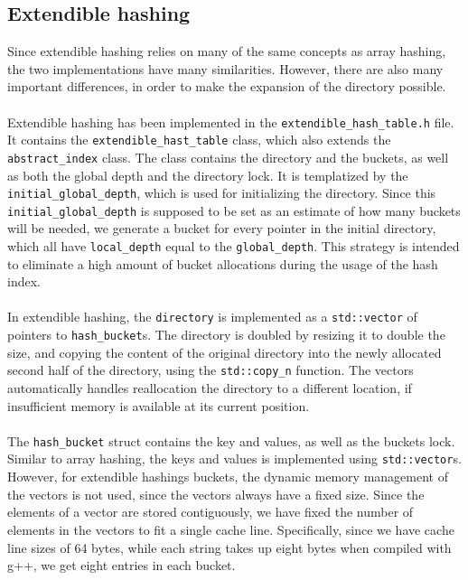 \documentclass[11pt]{report} %
\begin{document}
\subsection{Extendible hashing}
\label{subsec:implementation_extendible_hashing}
Since extendible hashing relies on many of the same concepts as array hashing, the two implementations have many similarities. However, there are also many important differences, in order to make the expansion of the directory possible. \\
\\
Extendible hashing has been implemented in the \verb|extendible_hash_table.h| file. It contains the \verb|extendible_hast_table| class, which also extends the \verb|abstract_index| class. The class contains the directory and the buckets, as well as both the global depth and the directory lock. It is templatized by the \verb|initial_global_depth|, which is used for initializing the directory. Since this \verb|initial_global_depth| is supposed to be set as an estimate of how many buckets will be needed, we generate a bucket for every pointer in the initial directory, which all have \verb|local_depth| equal to the \verb|global_depth|. This strategy is intended to eliminate a high amount of bucket allocations during the usage of the hash index.\\
\\
In extendible hashing, the \verb|directory| is implemented as a \verb|std::vector| of pointers to \verb|hash_bucket|s.  The directory is doubled by resizing it to double the size, and copying the content of the original directory into the newly allocated second half of the directory, using the \verb|std::copy_n| function. The vectors automatically handles reallocation the directory to a different location, if insufficient memory is available at its current position.\\
\\
The \verb|hash_bucket| struct contains the key and values, as well as the buckets lock. Similar to array hashing, the keys and values is implemented using \verb|std::vector|s. However, for extendible hashings buckets, the dynamic memory management of the vectors is not used, since the vectors always have a fixed size. Since the elements of a vector are stored contiguously, we have fixed the number of elements in the vectors to fit a single cache line. Specifically, since we have cache line sizes of 64 bytes, while each string takes up eight bytes when compiled with g++, we get eight entries in each bucket. \\
\end{document}
